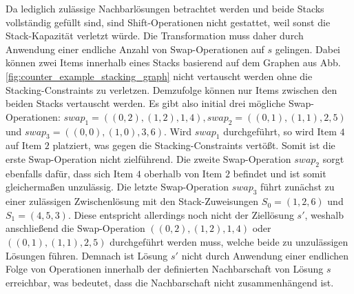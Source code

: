 Da lediglich zulässige Nachbarlösungen betrachtet werden und beide Stacks vollständig gefüllt sind,
sind Shift-Operationen nicht gestattet, weil sonst die Stack-Kapazität verletzt würde.
Die Transformation muss daher durch Anwendung einer endliche Anzahl von Swap-Operationen auf $s$ gelingen.
Dabei können zwei Items innerhalb eines Stacks basierend auf dem Graphen aus Abb. \ref{fig:counter_example_stacking_graph}  nicht vertauscht werden ohne die Stacking-Constraints zu verletzen.
Demzufolge können nur Items zwischen den beiden Stacks vertauscht werden. Es gibt also initial drei mögliche
Swap-Operationen: $swap_1 = ((0, 2), (1, 2), 1, 4), swap_2 = ((0, 1), (1, 1), 2, 5)$ und $swap_3 = ((0, 0), (1, 0), 3, 6)$.
Wird $swap_1$ durchgeführt, so wird Item $4$ auf Item $2$ platziert, was gegen die Stacking-Constraints vertößt.
Somit ist die erste Swap-Operation nicht zielführend. Die zweite Swap-Operation $swap_2$ sorgt ebenfalls dafür,
dass sich Item $4$ oberhalb von Item $2$ befindet und ist somit gleichermaßen unzulässig.
Die letzte Swap-Operation $swap_3$ führt zunächst zu einer zulässigen Zwischenlösung mit den Stack-Zuweisungen
$S_0 = (1, 2, 6)$ und $S_1 = (4, 5, 3)$. Diese entspricht allerdings noch nicht der Ziellösung $s'$,
weshalb anschließend die Swap-Operation $((0, 2), (1, 2), 1, 4)$ oder $((0, 1), (1, 1), 2, 5)$
durchgeführt werden muss, welche beide zu unzulässigen Lösungen führen. Demnach ist Lösung $s'$ nicht durch Anwendung einer endlichen Folge von Operationen innerhalb der definierten Nachbarschaft von Lösung $s$ erreichbar, was bedeutet, dass die Nachbarschaft nicht zusammenhängend ist.

